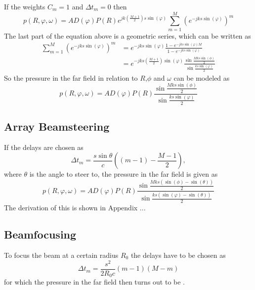 If the weights $C_m = 1$ and $\Delta t_m = 0$ then
\begin{equation}
    p(R,\varphi,\omega) 
    = 
    A D(\varphi) P(R)  e^{jk \left ( \frac{M + 1}{2} \right )s \sin{(\varphi)}} \sum_{m=1}^M \left ( e^{-jks \sin{(\varphi)}} \right ) ^ m
\end{equation}
The last part of the equation above is a geometric series, which can be written as 
\begin{align}
   \sum_{m=1}^M \left ( e^{-jks \sin{(\varphi)}} \right ) ^ m
    &= 
     e^{-jks \sin{(\varphi)}}\frac{1 - e^{-jks \sin{(\varphi) M }}}{1 - e^{-jks \sin{(\varphi)}}} \\
     &=
     e^{-jks\left ( \frac{M + 1}{2}\right ) \sin{(\varphi)}} \frac{\sin{\frac{Mks\sin{(\phi)}}{2}}}{\sin{\frac{ks\sin{(\varphi)}}{2}}}
\end{align}
So the pressure in the far field in relation to $R$,$\phi$ and $\omega$ can be modeled as
\begin{equation}
     p(R,\varphi,\omega) 
    = 
    A D(\varphi) P(R) \frac{\sin{\frac{Mks\sin{(\phi)}}{2}}}{\sin{\frac{ks\sin{(\varphi)}}{2}}}
\end{equation}
\subsection{Array Beamsteering}
If the delays are chosen as
\begin{equation}
    \Delta t_m = \frac{s \sin{\theta}}{c} \left ( (m-1) - \frac{M-1}{2}\right ),
\end{equation}
where $\theta$ is the angle to steer to,
the pressure in the far field is given as
\begin{equation}
     p(R,\varphi,\omega) 
    = 
    A D(\varphi) P(R) \frac{\sin{\frac{Mks(\sin{(\phi)} - \sin{(\theta)})}{2}}}{\sin{\frac{ks(\sin{(\varphi)} - \sin{(\theta)})}{2}}}
\end{equation}
The derivation of this is shown in Appendix ...

\subsection{Beamfocusing}
To focus the beam at a certain radius $R_0$ the delays have to be chosen as
\begin{equation}
    \Delta t_m = \frac{s^2}{2R_0c}(m-1)(M-m)
\end{equation}
for which the pressure in the far field then turns out to be . 
